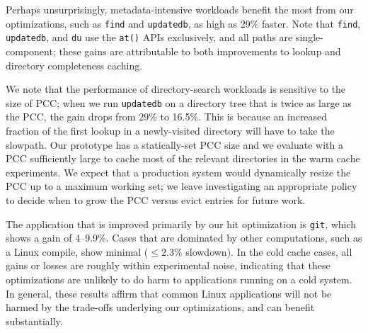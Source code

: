 

Perhaps unsurprisingly, metadata-intensive workloads benefit the most from our optimizations,
such as {\tt find} and {\tt update\-db}, as high 
as 29\% faster.  
Note that {\tt find}, {\tt update\-db}, and {\tt du} 
use the {\tt *at()} APIs exclusively, and all paths are single-component;
these gains are attributable 
to both improvements to lookup and 
directory completeness caching. %

We note that the performance of directory-search workloads is sensitive to the size of PCC;
when we run {\tt updatedb} on a directory tree that is twice as large as the PCC, 
the gain drops from 29\% to 16.5\%.  This is because an increased fraction of the first
lookup in a newly-visited directory will have to take the slowpath.
Our prototype has a statically-set PCC size and 
we evaluate with a PCC sufficiently large to cache most of the relevant directories in 
the warm cache experiments.  We expect that a production system would dynamically resize the 
PCC up to a maximum working set; we leave investigating an appropriate policy to
decide when to grow the PCC versus evict entries for future work.

The application that is improved primarily by our hit optimization is {\tt git},
which shows a gain of 4--9.9\%. %
Cases that are dominated by other computations, such as a Linux compile, show minimal ($\le 2.3\%$ slowdown).
In the cold cache cases, all gains or losses are roughly within experimental noise, 
indicating that these optimizations are unlikely to do harm to applications
running on a cold system.
In general, these results affirm that common Linux applications will not be harmed by 
the trade-offs underlying our optimizations, and can benefit substantially.

